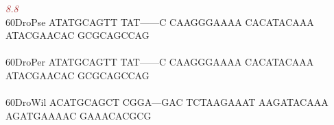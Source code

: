 \documentclass[11pt,twoside,reqno,a4paper]{article}
\begin{document}
{\hspace*{4\charwidth}\hspace*{7\charwidth}\hspace*{6\charwidth}\textit{\textcolor{Brown}{8.8}}\hspace*{1\charwidth}\hspace*{1\charwidth}\hspace*{1\charwidth}\hspace*{1\charwidth}\hspace*{1\charwidth}\hspace*{1\charwidth}\\
60\hspace*{2\charwidth}DroPse	ATATGCAGTT	TAT------C	CAAGGGAAAA	CACATACAAA	ATACGAACAC	GCGCAGCCAG	\\
\hspace*{4\charwidth}\hspace*{7\charwidth}\hspace*{1\charwidth}\hspace*{1\charwidth}\hspace*{1\charwidth}\hspace*{1\charwidth}\hspace*{1\charwidth}\hspace*{1\charwidth}\\
60\hspace*{2\charwidth}DroPer	ATATGCAGTT	TAT------C	CAAGGGAAAA	CACATACAAA	ATACGAACAC	GCGCAGCCAG	\\
\hspace*{4\charwidth}\hspace*{7\charwidth}\hspace*{1\charwidth}\hspace*{1\charwidth}\hspace*{1\charwidth}\hspace*{1\charwidth}\hspace*{1\charwidth}\hspace*{1\charwidth}\\
60\hspace*{2\charwidth}DroWil	ACATGCAGCT	CGGA---GAC	TCTAAGAAAT	AAGATACAAA	AGATGAAAAC	GAAACACGCG	\\
\hspace*{4\charwidth}\hspace*{7\charwidth}\hspace*{1\charwidth}\hspace*{1\charwidth}\hspace*{1\charwidth}\hspace*{1\charwidth}\hspace*{1\charwidth}\hspace*{1\charwidth}\\
}
\end{document}
